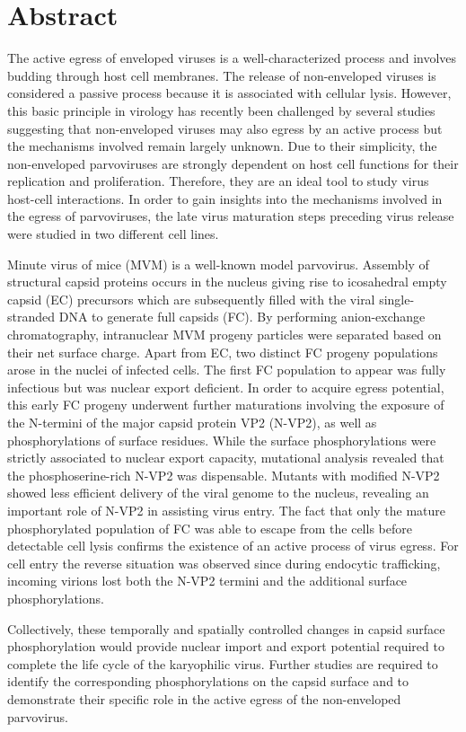 

\chapter*{Abstract}

\label{Abstract} %


The active egress of enveloped viruses is a well-characterized process and involves budding through host cell membranes. The release of non-enveloped viruses is considered a passive process because it is associated with cellular lysis. However, this basic principle in virology has recently been challenged by several studies suggesting that non-enveloped viruses may also egress by an active process but the mechanisms involved remain largely unknown. Due to their simplicity, the non-enveloped parvoviruses are strongly dependent on host cell functions for their replication and proliferation. Therefore, they are an ideal tool to study virus host-cell interactions. In order to gain insights into the mechanisms involved in the egress of parvoviruses, the late virus maturation steps preceding virus release were studied in two different cell lines. 
	
\par
\medskip
Minute virus of mice (MVM) is a well-known model parvovirus. Assembly of structural capsid proteins occurs in the nucleus giving rise to icosahedral empty capsid (EC) precursors which are subsequently filled with the viral single-stranded DNA to generate full capsids (FC). By performing anion-exchange chromatography, intranuclear MVM progeny particles were separated based on their net surface charge. Apart from EC, two distinct FC progeny populations arose in the nuclei of infected cells. The first FC population to appear was fully infectious but was nuclear export deficient. In order to acquire egress potential, this early FC progeny underwent further maturations involving the exposure of the N-termini of the major capsid protein VP2 (N-VP2), as well as phosphorylations of surface residues. While the surface phosphorylations were strictly associated to nuclear export capacity, mutational analysis revealed that the phosphoserine-rich N-VP2 was dispensable. Mutants with modified N-VP2 showed less efficient delivery of the viral genome to the nucleus, revealing an important role of N-VP2 in assisting virus entry. The fact that only the mature phosphorylated population of FC was able to escape from the cells before detectable cell lysis confirms the existence of an active process of virus egress. For cell entry the reverse situation was observed since during endocytic trafficking, incoming virions lost both the N-VP2 termini and the additional surface phosphorylations. 
	
\par
\medskip
Collectively, these temporally and spatially controlled changes in capsid surface phosphorylation would provide nuclear import and export potential required to complete the life cycle of the karyophilic virus. Further studies are required to identify the corresponding phosphorylations on the capsid surface and to demonstrate their specific role in the active egress of the non-enveloped parvovirus. 
